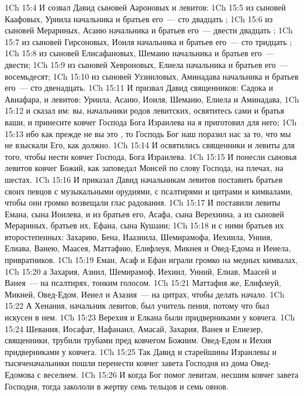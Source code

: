\vs 1Ch 15:4 И созвал Давид сыновей Аароновых и левитов:
\vs 1Ch 15:5 из сыновей Каафовых, Уриила начальника и братьев его~--- сто двадцать ;
\vs 1Ch 15:6 из сыновей Мерариных, Асаию начальника и братьев его~--- двести двадцать ;
\vs 1Ch 15:7 из сыновей Гирсоновых, Иоиля начальника и братьев его~--- сто тридцать ;
\vs 1Ch 15:8 из сыновей Елисафановых, Шемаию начальника и братьев его~--- двести;
\vs 1Ch 15:9 из сыновей Хевроновых, Елиела начальника и братьев его~--- восемьдесят;
\vs 1Ch 15:10 из сыновей Уззииловых, Аминадава начальника и братьев его~--- сто двенадцать.
\vs 1Ch 15:11 И призвал Давид священников: Садока и Авиафара, и левитов: Уриила, Асаию, Иоиля, Шемаию, Елиела и Аминадава,
\vs 1Ch 15:12 и сказал им: вы, начальники родов левитских, освятитесь сами и братья ваши, и принесите ковчег Господа Бога Израилева на  я приготовил для него;
\vs 1Ch 15:13 ибо как прежде не вы это , то Господь Бог наш поразил нас за то, что мы не взыскали Его, как должно.
\rsbpar\vs 1Ch 15:14 И освятились священники и левиты для того, чтобы нести ковчег Господа, Бога Израилева.
\vs 1Ch 15:15 И понесли сыновья левитов ковчег Божий, как заповедал Моисей по слову Господа, на плечах, на шестах.
\vs 1Ch 15:16 И приказал Давид начальникам левитов поставить братьев своих певцов с музыкальными орудиями, с псалтирями и цитрами и кимвалами, чтобы они громко возвещали глас радования.
\vs 1Ch 15:17 И поставили левиты Емана, сына Иоилева, и из братьев его, Асафа, сына Верехиина, а из сыновей Мерариных, братьев их, Ефана, сына Кушаии;
\vs 1Ch 15:18 и с ними братьев их второстепенных: Захарию, Бена, Иаазиила, Шемирамофа, Иехиила, Унния, Елиава, Ванею, Маасея, Маттафию, Елифлеуя, Микнея и Овед-Едома и Иеиела, привратников.
\vs 1Ch 15:19 Еман, Асаф и Ефан играли громко на медных кимвалах,
\vs 1Ch 15:20 а Захария, Азиил, Шемирамоф, Иехиил, Унний, Елиав, Маасей и Ванея~--- на псалтирях, тонким голосом.
\vs 1Ch 15:21 Маттафия же, Елифлеуй, Микней, Овед-Едом, Иеиел и Азазия~--- на цитрах, чтобы делать начало.
\vs 1Ch 15:22 А Хенания, начальник левитов, был учитель пения, потому что был искусен в нем.
\vs 1Ch 15:23 Верехия и Елкана были придверниками у ковчега.
\vs 1Ch 15:24 Шевания, Иосафат, Нафанаил, Амасай, Захария, Ванея и Елиезер, священники, трубили трубами пред ковчегом Божиим. Овед-Едом и Иехия  придверниками у ковчега.
\rsbpar\vs 1Ch 15:25 Так Давид и старейшины Израилевы и тысяченачальники пошли перенести ковчег завета Господня из дома Овед-Едомова с веселием.
\vs 1Ch 15:26 И когда Бог помог левитам, несшим ковчег завета Господня, тогда закололи в жертву семь тельцов и семь овнов.
